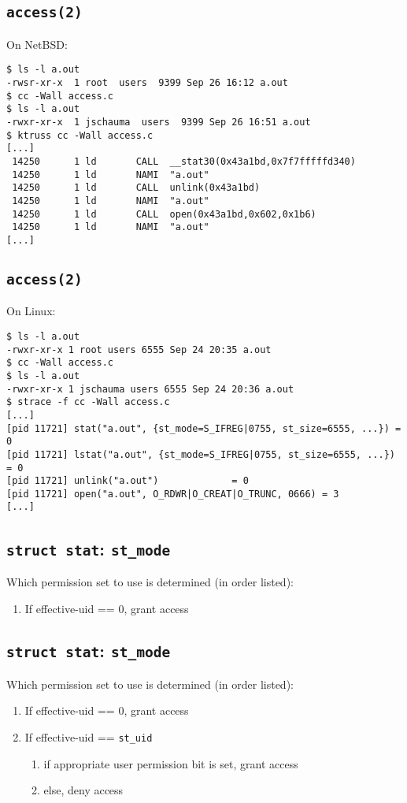 \documentclass[xga]{xdvislides}
\begin{document}
\subsection{{\tt access(2)}}
On NetBSD:
\begin{verbatim}
$ ls -l a.out
-rwsr-xr-x  1 root  users  9399 Sep 26 16:12 a.out
$ cc -Wall access.c
$ ls -l a.out
-rwxr-xr-x  1 jschauma  users  9399 Sep 26 16:51 a.out
$ ktruss cc -Wall access.c
[...]
 14250      1 ld       CALL  __stat30(0x43a1bd,0x7f7fffffd340)
 14250      1 ld       NAMI  "a.out"
 14250      1 ld       CALL  unlink(0x43a1bd)
 14250      1 ld       NAMI  "a.out"
 14250      1 ld       CALL  open(0x43a1bd,0x602,0x1b6)
 14250      1 ld       NAMI  "a.out"
[...]
\end{verbatim}

\subsection{{\tt access(2)}}
On Linux:
\begin{verbatim}
$ ls -l a.out
-rwxr-xr-x 1 root users 6555 Sep 24 20:35 a.out
$ cc -Wall access.c
$ ls -l a.out
-rwxr-xr-x 1 jschauma users 6555 Sep 24 20:36 a.out
$ strace -f cc -Wall access.c
[...]
[pid 11721] stat("a.out", {st_mode=S_IFREG|0755, st_size=6555, ...}) = 0
[pid 11721] lstat("a.out", {st_mode=S_IFREG|0755, st_size=6555, ...}) = 0
[pid 11721] unlink("a.out")             = 0
[pid 11721] open("a.out", O_RDWR|O_CREAT|O_TRUNC, 0666) = 3
[...]
\end{verbatim}


\subsection{{\tt struct stat}: {\tt st\_mode}}
Which permission set to use is determined (in order listed):
\begin{enumerate}
	\item If effective-uid == 0, grant access
\end{enumerate}

\subsection{{\tt struct stat}: {\tt st\_mode}}
Which permission set to use is determined (in order listed):
\begin{enumerate}
	\item If effective-uid == 0, grant access
	\item If effective-uid == {\tt st\_uid}
		\begin{enumerate}
			\item if appropriate user permission bit is set, grant access
			\item else, deny access
		\end{enumerate}
\end{enumerate}
\end{document}
